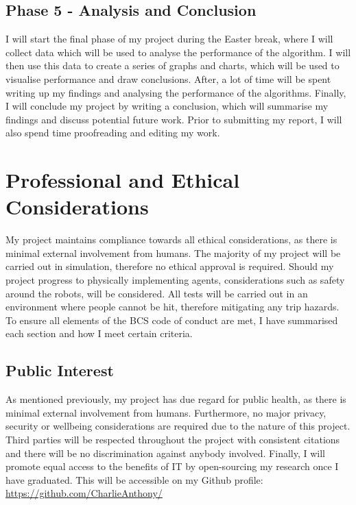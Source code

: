 \documentclass[12pt]{article}
\begin{document}
\subsection{Phase 5 - Analysis and Conclusion}
I will start the final phase of my project during the Easter break, where I will collect data which will be used to analyse
the performance of the algorithm. I will then use this data to create a series of graphs and charts, which will be used to
visualise performance and draw conclusions. After, a lot of time will be spent writing up my findings and analysing the performance
of the algorithms. Finally, I will conclude my project by writing a conclusion, which will summarise my findings and discuss
potential future work. Prior to submitting my report, I will also spend time proofreading and editing my work.


\section{Professional and Ethical Considerations}
My project maintains compliance towards all ethical considerations, as there is minimal external involvement from
humans. The majority of my project will be carried out in simulation, therefore no ethical approval is required. Should
my project progress to physically implementing agents, considerations such as safety around the robots, will be considered.
All tests will be carried out in an environment where people cannot be hit, therefore mitigating any trip hazards.\\

To ensure all elements of the BCS code of conduct are met, I have summarised each section and how I meet certain criteria. \\
\subsection{Public Interest}
As mentioned previously, my project has due regard for public health, as there is minimal external involvement from humans.
Furthermore, no major privacy, security or wellbeing considerations are required due to the nature of this project. Third parties
will be respected throughout the project with consistent citations and there will be no discrimination against anybody involved.
Finally, I will promote equal access to the benefits of IT by open-sourcing my research once I have graduated. This will be accessible
on my Github profile: \href{https://github.com/CharlieAnthony/}{https://github.com/CharlieAnthony/} \\
\end{document}
